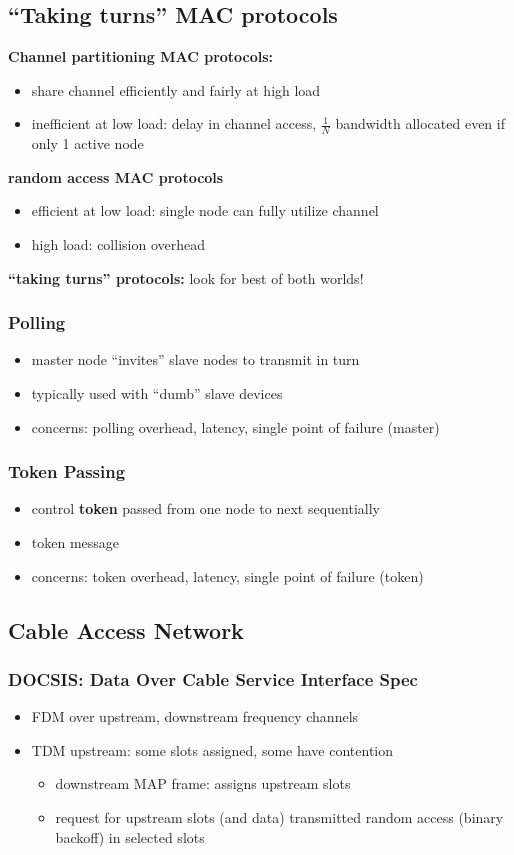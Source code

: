 \subsection{``Taking turns'' MAC protocols}
\textbf{Channel partitioning MAC protocols:}
\begin{itemize}
	\item share channel efficiently and fairly at high load
	\item inefficient at low load: delay in channel access, $\frac{1}{N}$ bandwidth allocated even if only 1 active node
\end{itemize}
\textbf{random access MAC protocols}
\begin{itemize}
	\item efficient at low load: single node can fully utilize channel
	\item high load: collision overhead
\end{itemize}
\textbf{``taking turns'' protocols:} look for best of both worlds!
\subsubsection{Polling}
\begin{itemize}
	\item master node ``invites'' slave nodes to transmit in turn
	\item typically used with ``dumb'' slave devices
	\item concerns: polling overhead, latency, single point of failure (master)
\end{itemize}
\subsubsection{Token Passing}
\begin{itemize}
	\item control \textbf{token} passed from one node to next sequentially
	\item token message
	\item concerns: token overhead, latency, single point of failure (token)
\end{itemize}

\subsection{Cable Access Network}
\subsubsection{DOCSIS: Data Over Cable Service Interface Spec}
\begin{itemize}
	\item FDM over upstream, downstream frequency channels
	\item TDM upstream: some slots assigned, some have contention
	\begin{itemize}
		\item downstream MAP frame: assigns upstream slots
		\item request for upstream slots (and data) transmitted random access (binary backoff) in selected slots
	\end{itemize}
\end{itemize}

